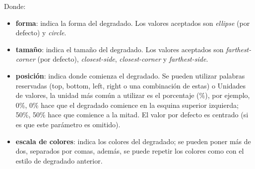 Donde:
\begin{itemize}
    \item \textbf{forma}: indica la forma del degradado. Los valores aceptados son \textit{ellipse} (por defecto) y \textit{circle}.
    \item \textbf{tamaño}: indica el tamaño del degradado. Los valores aceptados son \textit{farthest-corner} (por defecto), \textit{closest-side}, \textit{closest-corner} y \textit{farthest-side}.
    \item \textbf{posición}: indica donde comienza el degradado. Se pueden utilizar palabras reservadas (top, bottom, left, right o una combinación de estas) o Unidades de valores, la unidad más común a utilizar es el porcentaje (\%), por ejemplo, 0\%, 0\% hace que el degradado comience en la esquina superior izquierda; 50\%, 50\% hace que comience a la mitad. El valor por defecto es centrado (si es que este parámetro es omitido).
    \item \textbf{escala de colores}: indica los colores del degradado; se pueden poner más de dos, separados por comas, además, se puede repetir los colores como con el estilo de degradado anterior.
\end{itemize}

